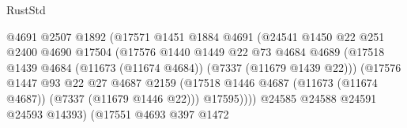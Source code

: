 \begin{lexlean}{RustStd}
\begin{coremodule}
                                          @4691
                                          @2507
                                          @1892
                                          (@17571
                                            @1451
                                            @1884
                                            @4691
                                            (@24541
                                              @1450
                                              @22
                                              @251
                                              @2400
                                              @4690
                                              @17504
                                              (@17576
                                                @1440
                                                @1449
                                                @22
                                                @73
                                                @4684
                                                @4689
                                                (@17518
                                                  @1439
                                                  @4684
                                                  (@11673 (@11674 @4684))
                                                  (@7337 (@11679 @1439 @22)))
                                                (@17576
                                                  @1447
                                                  @93
                                                  @22
                                                  @27
                                                  @4687
                                                  @2159
                                                  (@17518
                                                    @1446
                                                    @4687
                                                    (@11673 (@11674 @4687))
                                                    (@7337 (@11679 @1446 @22)))
                                                  @17595))))
                                          @24585
                                          @24588
                                          @24591
                                          @24593
                                          @14393)
                                        (@17551
                                          @4693
                                          @397
                                          @1472

\end{coremodule}
\end{lexlean}
